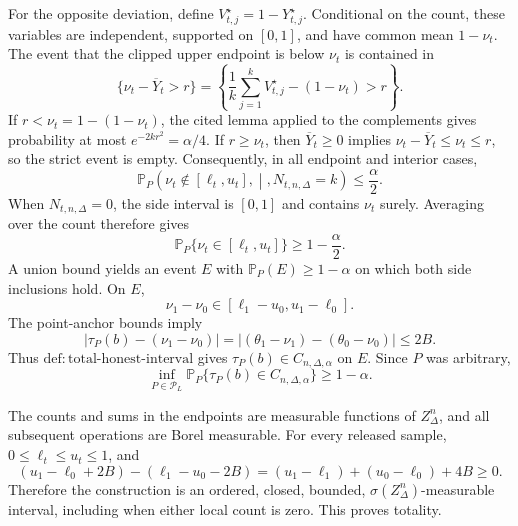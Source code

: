 For the opposite deviation, define \(V_{t,j}^{\star}=1-Y_{t,j}^{\star}\).  Conditional on the count, these variables are independent, supported on \([0,1]\), and have common mean \(1-\nu_t\).  The event that the clipped upper endpoint is below \(\nu_t\) is contained in
\[
 \{\nu_t-\overline Y_t>r\}
 =\left\{\frac1k\sum_{j=1}^kV_{t,j}^{\star}-(1-\nu_t)>r\right\}.
\]
If \(r<\nu_t=1-(1-\nu_t)\), the cited lemma applied to the complements gives probability at most \(e^{-2kr^2}=\alpha/4\).  If \(r\geq\nu_t\), then \(\overline Y_t\geq0\) implies \(\nu_t-\overline Y_t\leq\nu_t\leq r\), so the strict event is empty.  Consequently, in all endpoint and interior cases,
\[
 \mathbb P_P\!\left(\nu_t\notin[\ell_t,u_t],\middle|,N_{t,n,\Delta}=k\right)
 \leq\frac\alpha2.
\]
When \(N_{t,n,\Delta}=0\), the side interval is \([0,1]\) and contains \(\nu_t\) surely.  Averaging over the count therefore gives
\[
 \mathbb P_P\{\nu_t\in[\ell_t,u_t]\}\geq1-\frac\alpha2.
\]
A union bound yields an event \(E\) with \(\mathbb P_P(E)\geq1-\alpha\) on which both side inclusions hold.  On \(E\),
\[
 \nu_1-\nu_0\in[\ell_1-u_0,u_1-\ell_0].
\]
The point-anchor bounds imply
\[
 |\tau_P(b)-(\nu_1-\nu_0)|
 =| (\theta_1-\nu_1)-(\theta_0-\nu_0)|
 \leq2B.
\]
Thus \(\mathrm{def:total\text{-}honest\text{-}interval}\) gives \(\tau_P(b)\in C_{n,\Delta,\alpha}\) on \(E\).  Since \(P\) was arbitrary,
\[
 \inf_{P\in\mathcal P_L}\mathbb P_P\{\tau_P(b)\in C_{n,\Delta,\alpha}\}\geq1-\alpha.
\]

The counts and sums in the endpoints are measurable functions of \(Z_\Delta^n\), and all subsequent operations are Borel measurable.  For every released sample, \(0\leq\ell_t\leq u_t\leq1\), and
\[
 (u_1-\ell_0+2B)-(\ell_1-u_0-2B)
 =(u_1-\ell_1)+(u_0-\ell_0)+4B\geq0.
\]
Therefore the construction is an ordered, closed, bounded, \(\sigma(Z_\Delta^n)\)-measurable interval, including when either local count is zero.  This proves totality.

